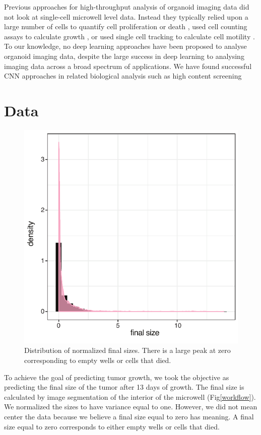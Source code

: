 \documentclass[10pt,twocolumn,letterpaper]{article}
\begin{document}
Previous approaches for high-throughput analysis of organoid imaging data did not look at single-cell microwell level data.  Instead they typically relied upon a large number of cells to quantify cell proliferation or death \cite{jabs2017screening},  used cell counting assays to calculate growth \cite{sebrell2018live}, or used single cell tracking to calculate cell motility \cite{geum2016epidermal}.  To our knowledge, no deep learning approaches have been proposed to analyse organoid imaging data, despite the large success in deep learning to analysing imaging data across a broad spectrum of applications.  We have found successful CNN approaches in related biological analysis such as high content screening \cite{simm2018repurposing}

\section{Data}
\begin{figure}[b!]
\begin{center}
 \includegraphics[width=0.8\linewidth]{figures/final_day_hyst2_area_density.pdf}
\end{center}
   \caption{Distribution of normalized final sizes.  There is a large peak at zero corresponding to empty wells or cells that died.}
\label{final_size_dist}
\end{figure}

To achieve the goal of predicting tumor growth, we took the objective as predicting the final size of the tumor after 13 days of growth.  The final size is calculated by image segmentation of the interior of the microwell (Fig\ref{workflow}).  We normalized the sizes to have variance equal to one.  However, we did not mean center the data because we believe a final size equal to zero has meaning.  A final size equal to zero corresponds to either empty wells or cells that died.  
\end{document}

